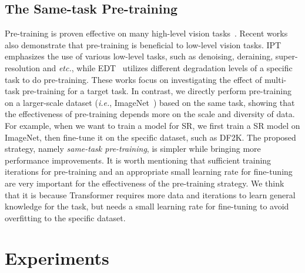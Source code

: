 \documentclass[10pt,twocolumn,letterpaper]{article}
\begin{document}
\subsection{The Same-task Pre-training}
Pre-training is proven effective on many high-level vision tasks~\cite{vit,bao2021beit,he2022masked}. Recent works~\cite{ipt,edt} also demonstrate that pre-training is beneficial to low-level vision tasks. IPT~\cite{ipt} emphasizes the use of various low-level tasks, such as denoising, deraining, super-resolution and \textit{etc.}, while EDT~\cite{edt} utilizes different degradation levels of a specific task to do pre-training. These works focus on investigating the effect of multi-task pre-training for a target task. In contrast, we directly perform pre-training on a larger-scale dataset (\textit{i.e.}, ImageNet~\cite{imagenet}) based on the same task, showing that the effectiveness of pre-training depends more on the scale and diversity of data. For example, when we want to train a model for  SR, we first train a  SR model on ImageNet, then fine-tune it on the specific dataset, such as DF2K. The proposed strategy, namely \textit{same-task pre-training}, is simpler while bringing more performance improvements. It is worth mentioning that sufficient training iterations for pre-training and an appropriate small learning rate for fine-tuning are very important for the effectiveness of the pre-training strategy. We think that it is because Transformer requires more data and iterations to learn general knowledge for the task, but 
needs a small learning rate for fine-tuning to avoid overfitting to the specific dataset.

\section{Experiments}
\end{document}

